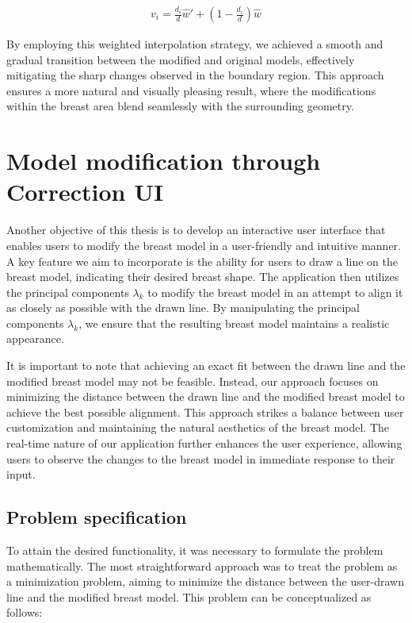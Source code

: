 \begin{align}\label{eq:interpolation}
    v_i = \frac{d_i}{d} \hat{w} ' + \left(1 - \frac{d_i}{d}\right) \hat{w}
\end{align}

By employing this weighted interpolation strategy, we achieved a smooth and gradual transition between the modified and original models, effectively mitigating the sharp changes 
observed in the boundary region. This approach ensures a more natural and visually pleasing result, where the modifications within the breast area blend seamlessly with the 
surrounding geometry.

\section{Model modification through Correction UI}\label{sec:correction_ui}

Another objective of this thesis is to develop an interactive user interface that enables users to modify the breast model in a user-friendly and intuitive manner. A key feature we aim to 
incorporate is the ability for users to draw a line on the breast model, indicating their desired breast shape. The application then utilizes the principal components $\lambda_k$ to modify 
the breast model in an attempt to align it as closely as possible with the drawn line. By manipulating the principal components $\lambda_k$, we ensure that the resulting breast model 
maintains a realistic appearance.

It is important to note that achieving an exact fit between the drawn line and the modified breast model may not be feasible. Instead, our approach focuses on minimizing the distance 
between the drawn line and the modified breast model to achieve the best possible alignment. This approach strikes a balance between user customization and maintaining the natural 
aesthetics of the breast model. The real-time nature of our application further enhances the user experience, allowing users to observe the changes to the breast model in immediate 
response to their input.

\subsection{Problem specification}

To attain the desired functionality, it was necessary to formulate the problem mathematically. The most straightforward approach was to treat the problem as a minimization problem, 
aiming to minimize the distance between the user-drawn line and the modified breast model. This problem can be conceptualized as follows:

